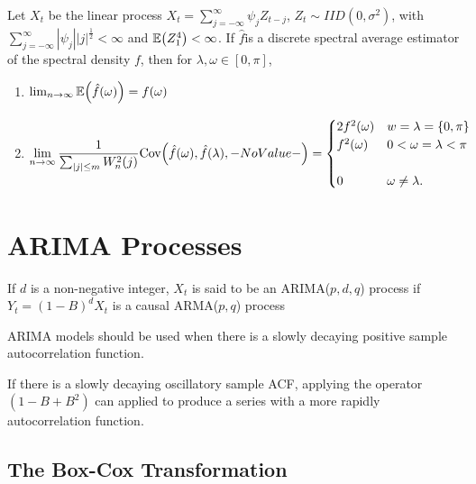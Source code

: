 \begin{thm}
  \label{sec:periodogram-5}
  Let $X_{t}$ be the linear process $X_{t} = \sum_{j=-\infty}^{\infty}
  \psi_{j} Z_{t-j}$, $Z_{t} \sim IID(0, \sigma^{2})$, with
  $\sum_{j=-\infty}^{\infty} |\psi_{j}| |j|^{\frac{1}{2}} < \infty$
  and $\E{Z_{1}^{4}} < \infty$.  If $\hat f$is a discrete spectral
  average estimator of the spectral density $f$, then for $\lambda,
  \omega \in [0, \pi]$,
  \begin{enumerate}
  \item $\lim_{n \rightarrow \infty} \E{\hat f(\omega)} = f(\omega)$
  \item
    \begin{align}
      \label{eq:76}
      \lim_{n \rightarrow \infty} \frac{1}{\sum_{|j| \leq m}^{}
        W_{n}^{2}(j)} \Cov{\hat f(\omega), \hat f(\lambda)} =
      \begin{cases}
        2 f^{2}(\omega) & w = \lambda = \{ 0, \pi \} \\
        f^{2}(\omega) & 0 < \omega = \lambda < \pi \\ \\
        0 & \omega \neq \lambda.
      \end{cases}
    \end{align}
  \end{enumerate}
\end{thm}

\section{ARIMA Processes}
\label{sec:arima-processes}

\begin{defn}
  \label{sec:arima-processes-1}
  If $d$ is a non-negative integer, $X_{t}$ is said to be an
  ARIMA($p,d,q$) process if $Y_{t} = (1 - B)^{d} X_{t}$ is a causal
  ARMA($p, q$) process
\end{defn}

\begin{thm}
  \label{sec:arima-processes-2}
  ARIMA models should be used when there is a slowly decaying positive
  sample autocorrelation function.

  If there is a slowly decaying oscillatory  sample ACF, applying
  the operator $(1 - B + B^{2})$ can applied to produce a series with
  a more rapidly autocorrelation function.
\end{thm}

\subsection{The Box-Cox Transformation}
\label{sec:box-cox-transf}

